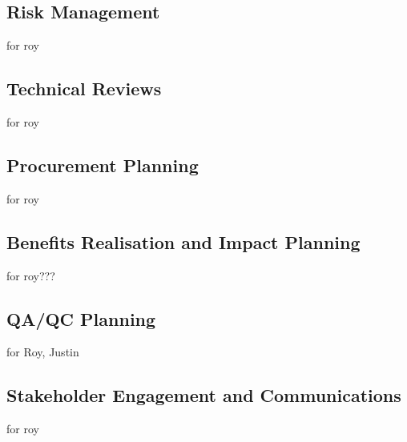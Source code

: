 \subsection{Risk Management}
for roy

\subsection{Technical Reviews}
for roy

\subsection{Procurement Planning}
for roy

\subsection{Benefits Realisation and Impact Planning}
for roy???

\subsection{QA/QC Planning}
for Roy, Justin

\subsection{Stakeholder Engagement and Communications}
for roy